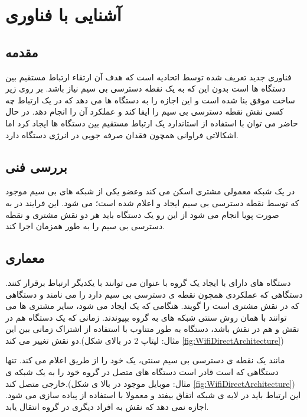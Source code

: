 \chapter{آشنایی با فناوری }
\thispagestyle{empty}

\section{مقدمه}
 فناوری جدید تعریف شده توسط اتحادیه 
  است که هدف آن ارتقاء ارتباط مستقیم بین دستگاه ها است بدون این که به یک نقطه دسترسی بی سیم
   نیاز باشد.
بر روی زیر ساخت موفق 
بنا شده است و این اجازه را به دستگاه ها می دهد که در یک ارتباط چه کسی نقش  نقطه دسترسی بی سیم را ایفا کند و عملکرد آن را انجام دهد. در حال حاضر می توان با استفاده از استاندارد 
یک ارتباط مستقیم بین دستگاه ها ایجاد کرد اما اشکالاتی فراوانی همچون فقدان صرفه جویی در انرژی
 دستگاه دارد.
 
\section{بررسی فنی}
 در یک شبکه معمولی 
مشتری
 اسکن می کند وعضو یکی  از شبکه های بی سیم موجود که توسط نقطه دسترسی بی سیم ایجاد و اعلام شده است؛ می شود. این فرایند در 
به صورت پویا
انجام می شود از این رو یک دستگاه 
باید هر دو نقش مشتری و نقطه دسترسی بی سیم را به طور همزمان اجرا کند.
\section{معماری}
دستگاه های دارای 
با ایجاد یک گروه با عنوان 
می توانند با یکدیگر ارتباط برقرار کنند. دستگاهی که عملکردی همچون نقطه ی دسترسی بی سیم دارد را 
می نامند و دستگاهی که در نقش مشتری است را 
گویند.
هنگامی که یک 
ایجاد می شود، سایر مشتری ها می توانند با همان روش سنتی شبکه های 
به گروه بپیوندند. زمانی که یک دستگاه هم در نقش 
 و هم در نقش 
باشد، دستگاه به طور متناوب با استفاده از اشتراک زمانی 
بین این دو نقش تغییر می کند.(مثال: لپتاپ 2 در بالای شکل \ref{fig:WifiDirectArchitecture})

 مانند یک نقطه ی دسترسی بی سیم سنتی، یک
  خود را از طریق 
  اعلام می کند. تنها دستگاهی که 
 است قادر است دستگاه های متصل در گروه خود را به یک شبکه ی خارجی متصل کند.(مثال: موبایل موجود در بالا ی شکل \ref{fig:WifiDirectArchitecture}) این ارتباط باید در لایه ی شبکه 
اتفاق بیفتد و معمولا با استفاده از 
پیاده سازی می شود.
اجازه نمی دهد که نقش 
به افراد دیگری در گروه انتقال یابد.

